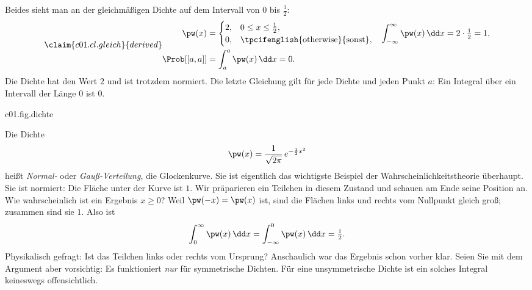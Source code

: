 Beides sieht man an der gleichmäßigen Dichte auf dem Intervall von $0$ bis $\tfrac12$:
\begin{equation}\label{c01.eq.gleich}\claim{c01.cl.gleich}{derived}
  \begin{aligned}
    \pw(x) &=
    \begin{cases}
      2, & 0 \leq x \leq \tfrac12, \\
      0, & \text{\tpcifenglish{otherwise}{sonst}},
    \end{cases}
    &\int_{-\infty}^{\infty} \pw(x)\,\dd x &= 2\cdot\tfrac12 = 1, \\
    \Prob[[a,a]] &= \int_a^a \pw(x)\,\dd x = 0 .
  \end{aligned}
\end{equation}
Die Dichte hat den Wert $2$ und ist trotzdem normiert. Die letzte Gleichung gilt für jede
Dichte und jeden Punkt $a$: Ein Integral über ein Intervall der Länge $0$ ist $0$.

\begin{tpcfigure}{c01.fig.dichte}
  \caption{(a) Die Dichte der Gauß-Verteilung aus Beispiel~\ref{c01.ex.gauss}. Die
    Wahrscheinlichkeit, dass das Ergebnis zwischen reellen Endpunkten $a \leq b$ liegt, ist die schraffierte
    Fläche und nicht die Höhe der Kurve. (b) Die gleichmäßige Dichte aus
    Gleichung~\eqref{c01.eq.gleich}: Sie hat die Höhe $2$, die Fläche darunter ist $1$.}
\end{tpcfigure}

\begin{example}\label{c01.ex.gauss}
  Die Dichte
  \begin{equation}\label{c01.eq.gauss}
    \pw(x) = \frac{1}{\sqrt{2\pi}}\, e^{-\frac12 x^2}
  \end{equation}
  heißt \emph{Normal-} oder \emph{Gauß-Verteilung}, die Glockenkurve. Sie ist eigentlich das
  wichtigste Beispiel der Wahrscheinlichkeitstheorie überhaupt. Sie ist normiert: Die Fläche
  unter der Kurve ist $1$. Wir präparieren ein Teilchen in diesem Zustand
  und schauen am Ende seine Position an. Wie wahrscheinlich ist ein Ergebnis $x \geq 0$?
  Weil $\pw(-x) = \pw(x)$ ist, sind die Flächen links und rechts vom Nullpunkt gleich groß;
  zusammen sind sie $1$. Also ist
  \begin{equation}\label{c01.eq.gauss-halb}
    \int_0^\infty \pw(x)\,\dd x = \int_{-\infty}^0 \pw(x)\,\dd x = \tfrac12 .
  \end{equation}
  Physikalisch gefragt: Ist das Teilchen links oder rechts vom Ursprung? Anschaulich war das
  Ergebnis schon vorher klar. Seien Sie mit dem Argument aber vorsichtig: Es funktioniert
  \emph{nur} für symmetrische Dichten. Für eine unsymmetrische Dichte ist ein solches
  Integral keineswegs offensichtlich.
\end{example}

